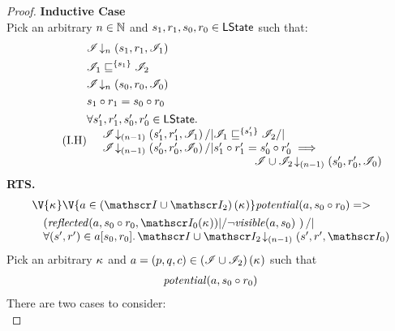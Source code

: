 \begin{lemma}
\begin{proof}
\noindent\textbf{Inductive Case}\\
Pick an arbitrary $n \in \mathbb{N}$ and $s_1, r_1, s_0, r_0 \in \textsf{LState}$ such that:
\begin{align}
	&\extendsAMUpto{\lmod}{n}{s_1}{r_1}{\lmod_1} \label{LSC2:Ass1}\\
	&\lmod_1 \weakenI{\{s_1\}} \lmod_2 \label{LSC2:Ass2}\\
	& \extendsAMUpto{\lmod}{n}{s_0}{r_0}{\lmod_0} \label{LSC2:Ass3}\\
	& s_1 \composeL r_1 = s_0 \composeL r_0 \label{LSC2:Ass4}\\
	\tag{I.H}	
	&\begin{array}{@{} l @{\hspace{-3cm}} l @{\hspace*{-2cm}} l @{}}
		\for{s'_1, r'_1, s'_0, r'_0 \in \LStates} &&\\
		& \extendsAMUpto{\lmod}{(n-1)}{s'_1}{r'_1}{\lmod_1} /| \lmod_1 \weakenI{\{s'_1\}} \lmod_2 /| & \\
		& \extendsAMUpto{\lmod}{(n-1)}{s'_0}{r'_0}{\lmod_0} /| s'_1 \composeL r'_1 = s'_0 \composeL r'_0 \implies & \\
		&& \extendsAMUpto{\lmod \cup \lmod_2}{(n-1)}{s'_0}{r'_0}{\lmod_0}
	\end{array} \label{LSC2:IH}
\end{align}
%
\textbf{RTS. } 
%
\begin{align}
  &\V{\ca{}}\V{a\in \left(\lmod \cup \lmod_2 \right) (\ca{})}
  \m{potential}(a, s_0 \composeL r_0) =>\null \nonumber \\
  &\quad\begin{array}{@{} l @{}}
		\left(\m{reflected}(a,s_0 \composeL r_0, \lmod_0(\ca{})) |/ \neg\m{visible}(a, s_0) \ \right) /| \\
		\for{(s', r') \in a[s_0, r_0]} \extendsAMUpto{\lmod \cup \lmod_2}{(n-1)}{s'}{r'}{\lmod_0}
 	\end{array}
  \label{LSC2:Goal3}
\end{align}
%
Pick an arbitrary $\kappa_{}$ and $a = (p, q, c) \in \left(\mathscr{I} \cup \mathscr{I}_2 \right)(\kappa_{})$ such that
%
\begin{align}
	\mathit{potential}(a, s_0 \circ r_0) \label{LSC2:Ass5}
\end{align}
There are two cases to consider:\\


\end{proof}
\end{lemma}
